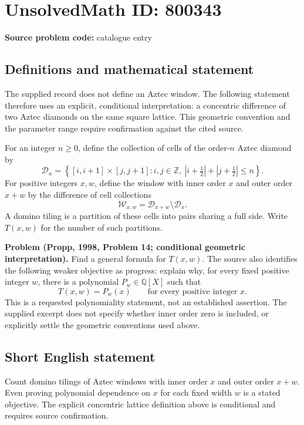 \documentclass[11pt]{article}
\newcommand{\Z}{\mathbb{Z}}
\newcommand{\Q}{\mathbb{Q}}
\begin{document}
\section*{UnsolvedMath ID: 800343}
\textbf{Source problem code:} catalogue entry
\subsection{Definitions and mathematical statement}
The supplied record does not define an Aztec window. The following statement therefore uses an explicit, conditional interpretation: a concentric difference of two Aztec diamonds on the same square lattice. This geometric convention and the parameter range require confirmation against the cited source.

For an integer \(n\geq 0\), define the collection of cells of the order-\(n\) Aztec diamond by
\[
\mathcal D_n=\left\{[i,i+1]\times[j,j+1]:i,j\in\Z,\ \left|i+\tfrac12\right|+\left|j+\tfrac12\right|\leq n\right\}.
\]
For positive integers \(x,w\), define the window with inner order \(x\) and outer order \(x+w\) by the difference of cell collections
\[
\mathcal W_{x,w}=\mathcal D_{x+w}\setminus\mathcal D_x.
\]
A domino tiling is a partition of these cells into pairs sharing a full side. Write \(T(x,w)\) for the number of such partitions.

\textbf{Problem (Propp, 1998, Problem 14; conditional geometric interpretation).} Find a general formula for \(T(x,w)\). The source also identifies the following weaker objective as progress: explain why, for every fixed positive integer \(w\), there is a polynomial \(P_w\in\Q[X]\) such that
\[
T(x,w)=P_w(x)\qquad\text{for every positive integer }x.
\]
This is a requested polynomiality statement, not an established assertion. The supplied excerpt does not specify whether inner order zero is included, or explicitly settle the geometric conventions used above.
\subsection{Short English statement}
Count domino tilings of Aztec windows with inner order \(x\) and outer order \(x+w\). Even proving polynomial dependence on \(x\) for each fixed width \(w\) is a stated objective. The explicit concentric lattice definition above is conditional and requires source confirmation.
\end{document}
